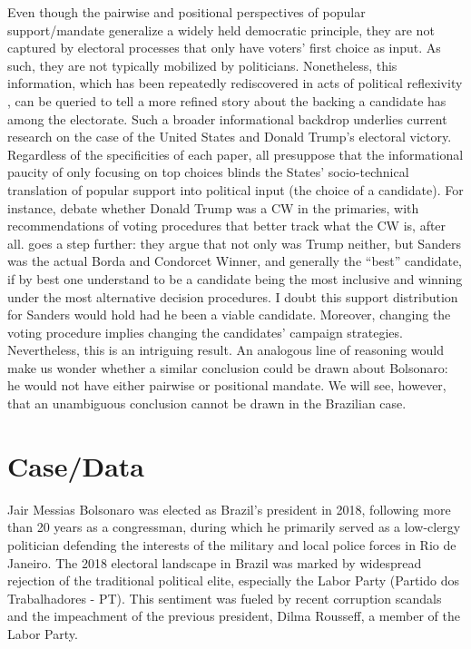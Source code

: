 \documentclass[hidelinks,11pt]{article} \usepackage[utf8]{inputenc}
\begin{document}
Even though the pairwise and positional perspectives of popular support/mandate generalize a widely held democratic principle, they are not captured by electoral processes that only have voters' first choice as input. As such, they are not typically mobilized by politicians. Nonetheless, this information, which has been repeatedly rediscovered in acts of political reflexivity \parencite{mclean14_stran_histor_social_choic_contr}, can be queried to tell a more refined story about the backing a candidate has among the electorate. Such a broader informational backdrop underlies current research on the case of the United States and Donald Trump's electoral victory. Regardless of the specificities of each paper, all presuppose that the informational paucity of only focusing on top choices blinds the States' socio-technical translation of popular support into political input (the choice of a candidate). For instance, \textcite{potthoff2021condorcet, woon2020trump, kurrild2018trump} debate whether Donald Trump was a CW in the primaries, with recommendations of voting procedures that better track what the CW is, after all. \textcite{igersheim22_compar_votin_method} goes a step further: they argue that not only was Trump neither, but Sanders was the actual Borda and Condorcet Winner, and generally the ``best'' candidate, if by best one understand to be a candidate being the most inclusive and winning under the most alternative decision procedures. I doubt this support distribution for Sanders would hold had he been a viable candidate. Moreover, changing the voting procedure implies changing the candidates' campaign strategies. Nevertheless, this is an intriguing result. An analogous line of reasoning would make us wonder whether a similar conclusion could be drawn about Bolsonaro: he would not have either pairwise or positional mandate. We will see, however, that an unambiguous conclusion cannot be drawn in the Brazilian case.
\section{Case/Data}
 Jair Messias Bolsonaro was elected as Brazil's president in 2018, following more than 20 years as a congressman, during which he primarily served as a low-clergy politician defending the interests of the military and local police forces in Rio de Janeiro. The 2018 electoral landscape in Brazil was marked by widespread rejection of the traditional political elite, especially the Labor Party (Partido dos Trabalhadores - PT). This sentiment was fueled by recent corruption scandals and the impeachment of the previous president, Dilma Rousseff, a member of the Labor Party.
\end{document}
